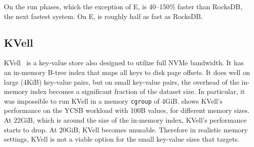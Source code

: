 On the run phases, which the exception of E, \sysname is 40--150\% faster than
RocksDB, the next fastest system. On E, \sysname is roughly half as fast as
RocksDB.


\subsection{KVell}\label{sec:kvell}

KVell~\cite{DBLP:conf/sosp/LepersBGZ19} is a key-value store also designed to
utilize full NVMe bandwidth.  It has an in-memory B-tree index that maps all
keys to disk page offsets.  It does well on large (4KiB) key-value pairs, but
on small key-value pairs, the overhead of the in-memory index becomes a
significant fraction of the dataset size.  In particular, it was impossible to
run KVell in a memory \texttt{cgroup} of 4GiB.   shows
KVell's performance on the YCSB workload with 100B values, for different memory
sizes. At 22GiB, which is around the size of the in-memory index, KVell's
performance starts to drop. At 20GiB, KVell becomes unusable. Therefore in
realistic memory settings, KVell is not a viable option for the small key-value
sizes that \sysname targets.

